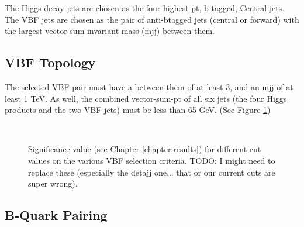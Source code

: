         The Higgs decay jets are chosen as the four highest-pt, b-tagged, Central jets.
        The VBF jets are chosen as the pair of anti-btagged jets (central or forward)
            with the largest vector-sum invariant mass (mjj) between them.


    \subsection{VBF Topology}
        
        The selected VBF pair must have a \deta between them of at least 3,
            and an mjj of at least 1 TeV.
        As well, the combined vector-sum-pt of all six jets
            (the four Higgs products and the two VBF jets)
            must be less than 65 GeV.
        (See Figure \ref{fig:vbf_cuts})

        \begin{figure}[tbh]
            \\
            \caption{
                Significance value (see Chapter \ref{chapter:results})
                    for different cut values on the various VBF selection criteria\cite{vbf_hh_4b_2018_int}.
                TODO: I might need to replace these (especially the detajj one... that or our current cuts are super wrong).
            }
            \label{fig:vbf_cuts}
        \end{figure}
        \FloatBarrier


    \subsection{B-Quark Pairing}
        
